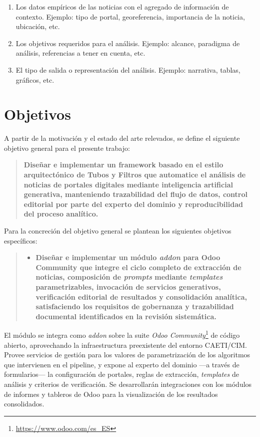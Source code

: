 \documentclass[12pt]{report}
\begin{document}
\begin{enumerate}
  \item Los datos empíricos de las noticias con el agregado de información de contexto. Ejemplo:  tipo de portal, georeferencia, importancia de la noticia, ubicación, etc.
  \item Los objetivos requeridos para el análisis. Ejemplo: alcance, paradigma de análisis, referencias a tener en cuenta, etc.
  \item El tipo de salida o representación del análisis. Ejemplo: narrativa, tablas, gráficos, etc.
\end{enumerate}
\section{Objetivos}
\label{sec:intro-objetivos}
A partir de la motivación y el estado del arte relevados, se define el siguiente objetivo general para el presente trabajo:

\begin{quote}
  \textbf{Diseñar e implementar un framework basado en el estilo arquitectónico de Tubos y Filtros que automatice el análisis de noticias de portales digitales mediante inteligencia artificial generativa, manteniendo trazabilidad del flujo de datos, control editorial por parte del experto del dominio y reproducibilidad del proceso analítico.}
\end{quote}

Para la concreción del objetivo general se plantean los siguientes objetivos específicos:

\vspace{0.3 cm}

\begin{quote}
  \begin{itemize}
    \item [OE1:] \textbf{Diseñar e implementar un módulo \textit{addon} para Odoo Community que integre el ciclo completo de extracción de noticias, composición de \textit{prompts} mediante \textit{templates} parametrizables, invocación de servicios generativos, verificación editorial de resultados y consolidación analítica, satisfaciendo los requisitos de gobernanza y trazabilidad documental identificados en la revisión sistemática.}
  \end{itemize}
\end{quote}

\vspace{0.3 cm}

El módulo se integra como \textit{addon} sobre la suite \textit{Odoo Community}\footnote{\url{https://www.odoo.com/es_ES}} de código abierto, aprovechando la infraestructura preexistente del entorno CAETI/CIM. Provee servicios de gestión para los valores de parametrización de los algoritmos que intervienen en el pipeline, y expone al experto del dominio ---a través de formularios--- la configuración de portales, reglas de extracción, \textit{templates} de análisis y criterios de verificación. Se desarrollarán integraciones con los módulos de informes y tableros de Odoo para la visualización de los resultados consolidados.
\end{document}
